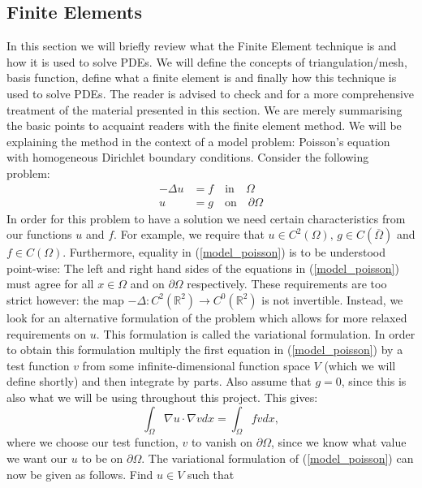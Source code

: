 \documentclass[12pt,a4paper]{article}
\theoremstyle{definition}
\begin{document}
\subsection{Finite Elements}
In this section we will briefly review what the Finite Element technique is and how it is used to solve PDEs.  We will define the concepts of triangulation/mesh, basis function, define what a finite element is and finally how this technique is used to solve PDEs.  The reader is advised to check \cite{logg2012automated} and \cite{brenner2007mathematical} for a more comprehensive treatment of the material presented in this section.  We are merely summarising the basic points to acquaint readers with the finite element method.   We will be explaining the method in the context of a model problem: Poisson's equation with homogeneous Dirichlet boundary conditions.  Consider the following problem:
\begin{equation}\label{model_poisson}
\begin{aligned}
-\Delta u &= f \quad \text{in}\quad \Omega\\
u &= g \quad \text{on}\quad \partial \Omega
\end{aligned}
\end{equation}
In order for this problem to have a solution we need certain characteristics from our functions $u$ and $f$.  For example, we require that $u\in C^2\left(\Omega\right) ,\,g\in C\left(\overline{\Omega}\right)$ and $f \in C\left(\Omega\right)$.  Furthermore, equality in (\ref{model_poisson}) is to be understood point-wise:  The left and right hand sides of the equations in (\ref{model_poisson}) must agree for all $x \in \Omega$ and on $\partial\Omega$ respectively. These requirements are too strict however:  the map $-\Delta : C^2\left(\mathbb{R}^2\right)\rightarrow C^0\left(\mathbb{R}^2\right)$ is not invertible.  Instead, we look for an alternative formulation of the problem which allows for more relaxed requirements on $u$.  This formulation is called the variational formulation.   In order to obtain this formulation multiply the first equation in (\ref{model_poisson}) by a test function $v$ from some infinite-dimensional function space $V$ (which we will define shortly) and then integrate by parts.  Also assume that $g=0$, since this is also what we will be using throughout this project.  This gives:
\begin{equation}
\int_{\Omega}\nabla u \cdot \nabla v dx =\int_{\Omega}fvdx,
\end{equation}
where we choose our test function, $v$ to vanish on $\partial \Omega$, since we know what value we want our $u$ to be on $\partial \Omega$.  The variational formulation of (\ref{model_poisson}) can now be given as follows.  Find $u\in V$ such that
\end{document}
